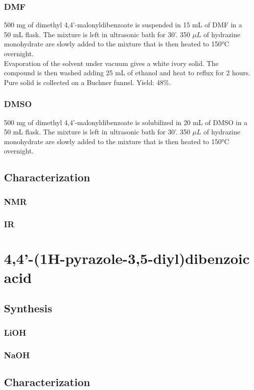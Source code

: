 \documentclass[../Master.tex]{subfiles}
\begin{document}
\subsubsection{DMF}
500 mg of dimethyl 4,4'-malonyldibenzoate is suspended in 15 mL of DMF in a 50 mL flask. The mixture is left in ultrasonic bath for 30'. 350 \(\mu L\) of hydrazine monohydrate are slowly added to the mixture that is then heated to 150°C overnight.\\
Evaporation of the solvent under vacuum gives a white ivory solid. The compound is then washed adding 25 mL of ethanol and heat to reflux for 2 hours. Pure solid is collected on a Buchner funnel. Yield: 48\%.
\subsubsection{DMSO}
500 mg of dimethyl 4,4'-malonyldibenzoate is solubilized in 20 mL of DMSO in a 50 mL flask. The mixture is left in ultrasonic bath for 30'. 350 \(\mu L\) of hydrazine monohydrate are slowly added to the mixture that is then heated to 150°C overnight.\\
\subsection{Characterization}
\subsubsection{NMR}
\subsubsection{IR}
\section{4,4'-(1H-pyrazole-3,5-diyl)dibenzoic acid}
\subsection{Synthesis}
\subsubsection{LiOH}
\subsubsection{NaOH}
\subsection{Characterization}
\end{document}
